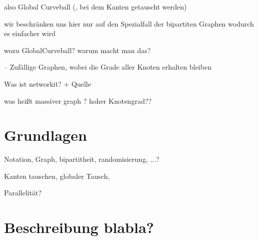 \documentclass[a4paper]{scrreprt}
\theoremstyle{plain} %
\theoremstyle{definition} %
\begin{document}
also Global Curveball (, bei dem Kanten getauscht werden)



wir beschränken uns hier nur auf den Spezialfall der bipartiten Graphen wodurch es einfacher wird 


wozu GlobalCurveball?
warum macht man das?

-- Zufällige Graphen, wobei die Grade aller Knoten erhalten bleiben

Was ist networkit? +  Quelle


was heißt massiver graph ? 
hoher Knotengrad??




\chapter{Grundlagen}

Notation, Graph, bipartitheit, randomisierung, ...? 

Kanten tauschen, globaler Tausch, 



Parallelität?



\chapter{Beschreibung blabla?}
\end{document}
